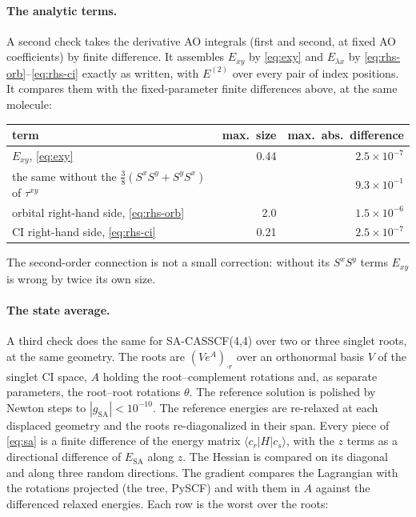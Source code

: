\documentclass[11pt]{article}
\begin{document}
\paragraph{The analytic terms.} A second check takes the derivative AO
integrals (first and second, at fixed AO coefficients) by finite
difference. It assembles $E_{xy}$ by \eqref{eq:exy} and $E_{\lambda x}$ by
\eqref{eq:rhs-orb}--\eqref{eq:rhs-ci} exactly as written, with $E^{(2)}$
over every pair of index positions. It compares them with the
fixed-parameter finite differences above, at the same molecule:

\begin{center}
\begin{tabular}{@{}lrr@{}}
\toprule
term & max.\ size & max.\ abs.\ difference \\
\midrule
$E_{xy}$, \eqref{eq:exy} & 0.44 & $2.5\times10^{-7}$ \\
\quad the same without the $\frac38(S^xS^y + S^yS^x)$ of $\tau^{xy}$ & & $9.3\times10^{-1}$ \\
orbital right-hand side, \eqref{eq:rhs-orb} & 2.0 & $1.5\times10^{-6}$ \\
CI right-hand side, \eqref{eq:rhs-ci} & 0.21 & $2.5\times10^{-7}$ \\
\bottomrule
\end{tabular}
\end{center}

\noindent The second-order connection is not a small correction: without
its $S^xS^y$ terms $E_{xy}$ is wrong by twice its own size.

\paragraph{The state average.} A third check does the same for
SA-CASSCF(4,4) over two or three singlet roots, at the same geometry. The
roots are $(Ve^{A})_{\cdot r}$ over an orthonormal basis $V$ of the singlet
CI space, $A$ holding the root--complement rotations and, as separate
parameters, the root--root rotations $\theta$. The reference solution is
polished by Newton steps to $|g_{\mathrm{SA}}| < 10^{-10}$. The reference
energies are re-relaxed at each displaced geometry and the roots
re-diagonalized in their span. Every piece of \eqref{eq:sa} is a finite
difference of the energy matrix $\langle c_r|H|c_s\rangle$, with the $z$
terms as a directional difference of $E_{\mathrm{SA}}$ along $z$. The
Hessian is compared on its diagonal and along three random directions.
The gradient compares the Lagrangian with the rotations projected (the tree,
PySCF) and with them in $A$ against the differenced relaxed energies. Each
row is the worst over the roots:
\end{document}

